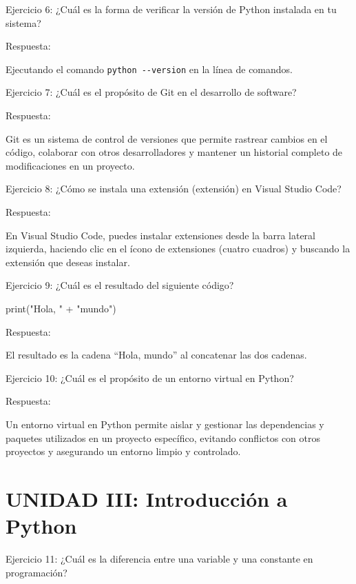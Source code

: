 \documentclass[
  a4paper,
  DIV=11,
  numbers=noendperiod,
  onepage,
  openany]{scrreprt}
\newenvironment{Shaded}{\begin{snugshade}}{\end{snugshade}}
\newcommand{\BuiltInTok}[1]{\textcolor[rgb]{0.00,0.23,0.31}{#1}}
\newcommand{\NormalTok}[1]{\textcolor[rgb]{0.00,0.23,0.31}{#1}}
\newcommand{\OperatorTok}[1]{\textcolor[rgb]{0.37,0.37,0.37}{#1}}
\newcommand{\StringTok}[1]{\textcolor[rgb]{0.13,0.47,0.30}{#1}}
\begin{document}
Ejercicio 6: ¿Cuál es la forma de verificar la versión de Python
instalada en tu sistema?

Respuesta:

Ejecutando el comando \texttt{python\ -\/-version} en la línea de
comandos.

Ejercicio 7: ¿Cuál es el propósito de Git en el desarrollo de software?

Respuesta:

Git es un sistema de control de versiones que permite rastrear cambios
en el código, colaborar con otros desarrolladores y mantener un
historial completo de modificaciones en un proyecto.

Ejercicio 8: ¿Cómo se instala una extensión (extensión) en Visual Studio
Code?

Respuesta:

En Visual Studio Code, puedes instalar extensiones desde la barra
lateral izquierda, haciendo clic en el ícono de extensiones (cuatro
cuadros) y buscando la extensión que deseas instalar.

Ejercicio 9: ¿Cuál es el resultado del siguiente código?

\begin{Shaded}
\begin{Highlighting}[]
\BuiltInTok{print}\NormalTok{(}\StringTok{"Hola, "} \OperatorTok{+} \StringTok{"mundo"}\NormalTok{)}
\end{Highlighting}
\end{Shaded}

Respuesta:

El resultado es la cadena ``Hola, mundo'' al concatenar las dos cadenas.

Ejercicio 10: ¿Cuál es el propósito de un entorno virtual en Python?

Respuesta:

Un entorno virtual en Python permite aislar y gestionar las dependencias
y paquetes utilizados en un proyecto específico, evitando conflictos con
otros proyectos y asegurando un entorno limpio y controlado.

\hypertarget{unidad-iii-introducciuxf3n-a-python-1}{%
\section{UNIDAD III: Introducción a
Python}\label{unidad-iii-introducciuxf3n-a-python-1}}

Ejercicio 11: ¿Cuál es la diferencia entre una variable y una constante
en programación?
\end{document}
